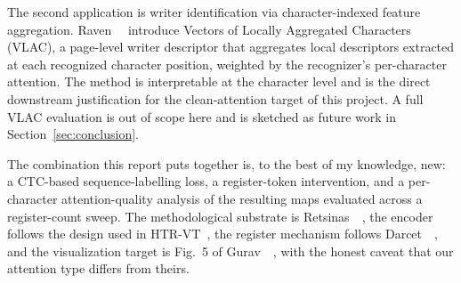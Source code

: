 The second application is writer identification via character-indexed feature aggregation. Raven~\etal~\cite{raven2025vlac} introduce Vectors of Locally Aggregated Characters (VLAC), a page-level writer descriptor that aggregates local descriptors extracted at each recognized character position, weighted by the recognizer's per-character attention. The method is interpretable at the character level and is the direct downstream justification for the clean-attention target of this project. A full VLAC evaluation is out of scope here and is sketched as future work in Section~\ref{sec:conclusion}.

The combination this report puts together is, to the best of my knowledge, new: a CTC-based sequence-labelling loss, a register-token intervention, and a per-character attention-quality analysis of the resulting maps evaluated across a register-count sweep. The methodological substrate is Retsinas~\etal~\cite{retsinas2024htrbestpractices}, the encoder follows the design used in HTR-VT~\cite{li2024htrvt}, the register mechanism follows Darcet~\etal~\cite{darcet2024registers}, and the visualization target is Fig.~5 of Gurav~\etal~\cite{gurav2025beyondmem}, with the honest caveat that our attention type differs from theirs.
